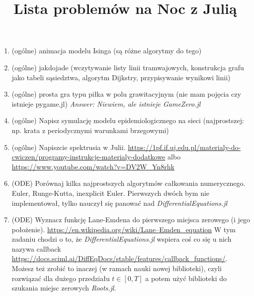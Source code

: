 \documentclass[12pt]{article}
\title{Lista problemów na Noc z Julią}
\author{}
\date{} %
\begin{document}
\maketitle %

\begin{enumerate}
\item (ogólne)
animacja modelu Isinga (są różne algorytmy do tego)
\item (ogólne)
jakdojade (wczytywanie listy linii tramwajowych, konstrukcja grafu jako tabeli sąsiedztwa, algorytm Dijkstry, przypisywanie wynikowi linii)
\item (ogólne)
prosta gra typu piłka w polu grawitacyjnym (nie mam pojęcia czy istnieje pygame.jl) \emph{Answer: Niewiem, ale istnieje GameZero.jl}
\item (ogólne)
Napisz symulację modelu epidemiologicznego na sieci (najprostszej: np. krata z periodycznymi warunkami brzegowymi)
\item (ogólne)
Napiszcie spektrusia w Julii. \url{https://1pf.if.uj.edu.pl/materialy-do-cwiczen/programy-instrukcje-materialy-dodatkowe} albo \url{https://www.youtube.com/watch?v=DV2W_Yn8rhk}
%
%
\item (ODE)
Porównaj kilka najprostszych algorytmów całkowania numerycznego. Euler, Runge-Kutta, inexplicit Euler.
Pierwszych dwóch bym nie implementował, tylko nauczył się panować nad \emph{DifferentialEquations.jl}
\item (ODE)
Wyznacz funkcję Lane-Emdena do pierwszego miejsca zerowego (i jego położenie). \url{https://en.wikipedia.org/wiki/Lane–Emden_equation} W tym zadaniu chodzi o to, że \emph{DifferentialEquations.jl} wspiera coś co się u nich nazywa callback
\url{https://docs.sciml.ai/DiffEqDocs/stable/features/callback_functions/}.
Możesz też zrobić to inaczej (w ramach nauki nowej biblioteki), czyli rozwiązać dla dużego przedziału $t \in [0, T]$ a potem użyć biblioteki do szukania miejsc zerowych \emph{Roots.jl}.


\end{enumerate}
\end{document}
